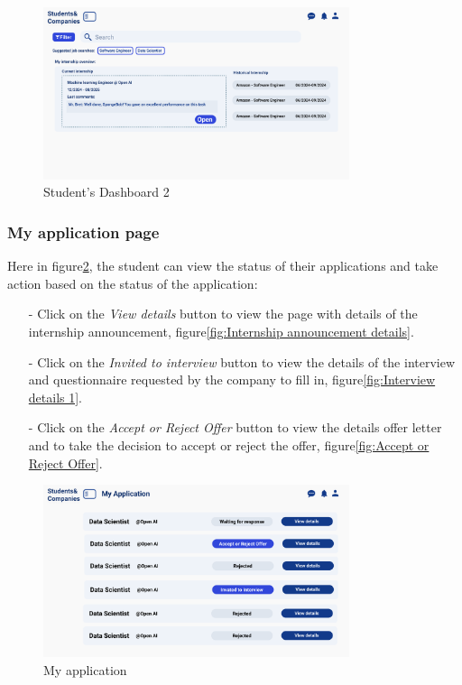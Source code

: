 \begin{figure}[H]
    \centering
    \includegraphics[width=0.8\textwidth]{Images/UI/Dashboard 2-student.png}
    \caption{Student's Dashboard 2}\label{fig:Dashboard Student 2}
\end{figure}
\subsubsection{My application page}
Here in figure\ref{fig:My application}, the student can view the status of their applications and take action based on the status of the application:
\begin{itemize}
    \item[-] Click on the \textit{View details} button to view the page with details of the internship announcement, figure\ref{fig:Internship announcement details}.
    \item[-] Click on the \textit{Invited to interview} button to view the details of the interview and questionnaire requested by the company to fill in, figure\ref{fig:Interview details 1}.
    \item[-] Click on the \textit{Accept or Reject Offer} button to view the details offer letter and to take the decision to accept or reject the offer, figure\ref{fig:Accept or Reject Offer}.
\end{itemize}
\begin{figure}[H]
    \centering
    \includegraphics[width=0.8\textwidth]{Images/UI/My Application-student.png}
    \caption{My application}\label{fig:My application}
\end{figure}
